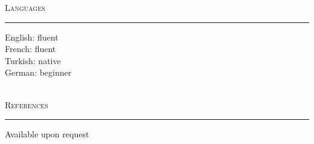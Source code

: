 \documentclass[10pt]{article}
\newcommand{\mysec}[1]{\vspace{2em}\textsc{\large #1}\vspace{1mm}\hrule\vspace{2mm}}
\newcommand{\mysub}[3]{\textbf{#1} {#2} \hfill {\em #3}}
\newcommand{\myssub}[1]{\hspace*{2mm}\parbox{163mm}{#1}\vspace*{2mm}}
\begin{document}



\mysec{Languages}


\myssub{English: fluent \\
French: fluent \\
Turkish: native \\
German: beginner}\\

\mysec{References}

\myssub{Available upon request\\}
\end{document}
